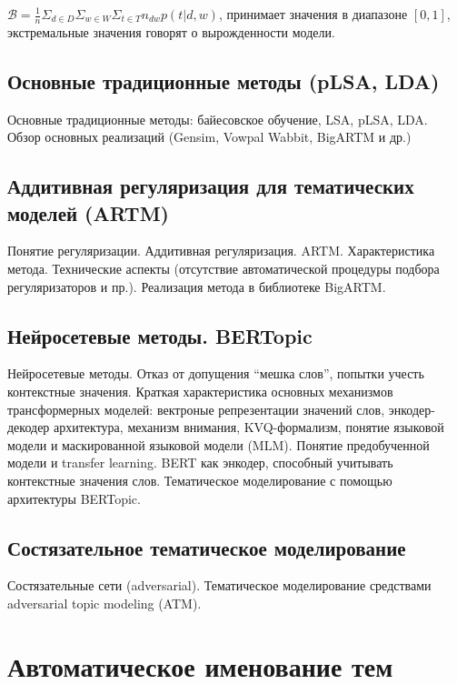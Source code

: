 $\mathcal{B} = \frac{1}{n}\Sigma_{d \in D}\Sigma_{w \in W}\Sigma_{t \in T}n_{dw}p(t|d,w)$, принимает значения в диапазоне $[0, 1]$, экстремальные значения говорят о вырожденности модели.


\section{Основные традиционные методы (pLSA, LDA)}

Основные традиционные методы: байесовское обучение, LSA, pLSA, LDA. Обзор основных реализаций (Gensim, Vowpal Wabbit, BigARTM и др.)

\section{Аддитивная регуляризация для тематических моделей (ARTM)}

Понятие регуляризации. Аддитивная регуляризация. ARTM. Характеристика метода. Технические аспекты (отсутствие автоматической процедуры подбора регуляризаторов и пр.). Реализация метода в библиотеке BigARTM.

\section{Нейросетевые методы. BERTopic}

Нейросетевые методы. Отказ от допущения ``мешка слов'', попытки учесть контекстные значения. Краткая характеристика основных механизмов трансформерных моделей: вектроные репрезентации значений слов, энкодер-декодер архитектура, механизм внимания, KVQ-формализм, понятие языковой модели и маскированной языковой модели (MLM). Понятие предобученной модели и transfer learning. BERT как энкодер, способный учитывать контекстные значения слов. Тематическое моделирование с помощью архитектуры BERTopic.

\section{Состязательное тематическое моделирование}

Состязательные сети (adversarial). Тематическое моделирование средствами adversarial topic modeling (ATM).



\chapter{Автоматическое именование тем}

